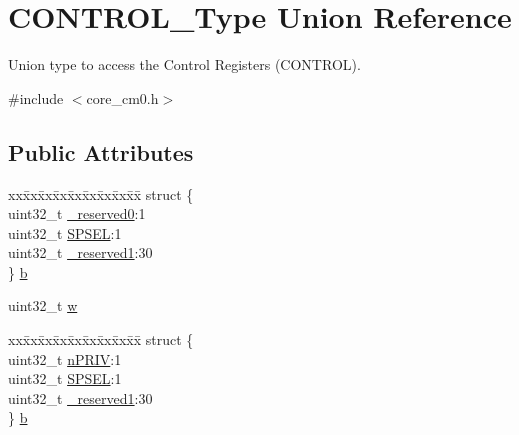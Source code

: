 \hypertarget{union_c_o_n_t_r_o_l___type}{\section{C\-O\-N\-T\-R\-O\-L\-\_\-\-Type Union Reference}
\label{union_c_o_n_t_r_o_l___type}
}


Union type to access the Control Registers (C\-O\-N\-T\-R\-O\-L).  




{\ttfamily \#include $<$core\-\_\-cm0.\-h$>$}

\subsection*{Public Attributes}
\begin{DoxyCompactItemize}
\item 
\begin{tabbing}
xx\=xx\=xx\=xx\=xx\=xx\=xx\=xx\=xx\=\kill
struct \{\\
\>uint32\_t \hyperlink{union_c_o_n_t_r_o_l___type_af8c314273a1e4970a5671bd7f8184f50}{\_reserved0}:1\\
\>uint32\_t \hyperlink{union_c_o_n_t_r_o_l___type_a8cc085fea1c50a8bd9adea63931ee8e2}{SPSEL}:1\\
\>uint32\_t \hyperlink{union_c_o_n_t_r_o_l___type_aa7a5662079a447f801034d108f80ce49}{\_reserved1}:30\\
\} \hyperlink{union_c_o_n_t_r_o_l___type_adc6a38ab2980d0e9577b5a871da14eb9}{b}\\

\end{tabbing}\item 
uint32\-\_\-t \hyperlink{union_c_o_n_t_r_o_l___type_a6b642cca3d96da660b1198c133ca2a1f}{w}
\item 
\begin{tabbing}
xx\=xx\=xx\=xx\=xx\=xx\=xx\=xx\=xx\=\kill
struct \{\\
\>uint32\_t \hyperlink{union_c_o_n_t_r_o_l___type_a35c1732cf153b7b5c4bd321cf1de9605}{nPRIV}:1\\
\>uint32\_t \hyperlink{union_c_o_n_t_r_o_l___type_a8cc085fea1c50a8bd9adea63931ee8e2}{SPSEL}:1\\
\>uint32\_t \hyperlink{union_c_o_n_t_r_o_l___type_aa7a5662079a447f801034d108f80ce49}{\_reserved1}:30\\
\} \hyperlink{union_c_o_n_t_r_o_l___type_ae3b4861e899b1f68818b60033a3914d9}{b}\\


\end{tabbing}
\end{DoxyCompactItemize}
